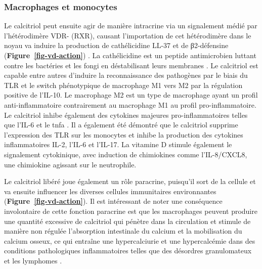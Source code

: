 \documentclass[
  a4paper,
  DIV=11,
  numbers=noendperiod,
  listof=totoc]{scrreprt}
\begin{document}
\subsubsection{Macrophages et monocytes}\label{macrophages-et-monocytes}

Le calcitriol peut ensuite agir de manière intracrine via un signalement
médié par l'hétérodimère \ac{VDR}- (\acl{RXR}), causant
l'importation de cet hétérodimère dans le noyau va induire la production
de cathélicidine LL-37 et de β2-défensine
(\textbf{Figure~\ref{fig-vd-action}})
\autocite{Caprio.2017,Yasmin.2005}. La cathélicidine est un peptide
antimicrobien luttant contre les bactéries et les fongi en déstabilisant
leurs membranes \autocite{Charoenngam.2020}. Le calcitriol est capable
entre autres d'induire la reconnaissance des pathogènes par le biais du
\ac{TLR} et le switch phénotypique de macrophage M1 vers M2 par la
régulation positive de l'\ac{IL-10}. Le macrophage M2 est un type de
macrophage ayant un profil anti-inflammatoire contrairement au
macrophage M1 au profil pro-inflammatoire. Le calcitriol inhibe
également des cytokines majeures pro-inflammatoires telles que
l'\ac{IL-6} et le \ac{tnfa} \autocite{Meza-Meza.2022,Caprio.2017}. Il a
également été démontré que le calcitriol supprime l'expression des
\ac{TLR} sur les monocytes et inhibe la production des cytokines
inflammatoires \ac{IL-2}, l'\ac{IL-6} et l'\ac{IL-17}. La vitamine D
stimule également le signalement cytokinique, avec induction de
chimiokines comme l'IL-8/CXCL8, une chimiokine agissant sur le
neutrophile.

Le calcitriol libéré joue également un rôle paracrine, puisqu'il sort de
la cellule et va ensuite influencer les diverses cellules immunitaires
environnantes (\textbf{Figure~\ref{fig-vd-action}}). Il est intéressant
de noter une conséquence involontaire de cette fonction paracrine est
que les macrophages peuvent produire une quantité excessive de
calcitriol qui pénètre dans la circulation et stimule de manière non
régulée l'absorption intestinale du calcium et la mobilisation du
calcium osseux, ce qui entraîne une hypercalciurie et une hypercalcémie
dans des conditions pathologiques inflammatoires telles que des
désordres granulomateux et les lymphomes \autocite{Charoenngam.2020}.
\end{document}
